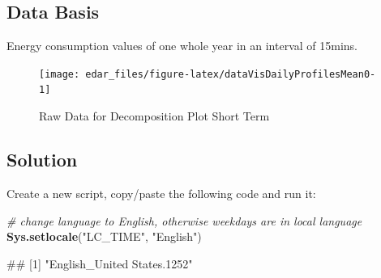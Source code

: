 \documentclass[
  a4paperpaper,
]{book}
\newenvironment{Shaded}{\begin{snugshade}}{\end{snugshade}}
\newcommand{\CommentTok}[1]{\textcolor[rgb]{0.56,0.35,0.01}{\textit{#1}}}
\newcommand{\KeywordTok}[1]{\textcolor[rgb]{0.13,0.29,0.53}{\textbf{#1}}}
\newcommand{\NormalTok}[1]{#1}
\newcommand{\StringTok}[1]{\textcolor[rgb]{0.31,0.60,0.02}{#1}}
\let\oldShaded\Shaded
\let\endoldShaded\endShaded
\renewenvironment{Shaded}{\footnotesize\oldShaded}{\endoldShaded}
\let\oldverbatim\verbatim
\let\endoldverbatim\endverbatim
\renewenvironment{verbatim}{\footnotesize\oldverbatim}{\endoldverbatim}
\begin{document}
\hypertarget{data-basis-10}{%
\subsection{Data Basis}\label{data-basis-10}}

Energy consumption values of one whole year in an interval of 15mins.

\begin{figure}
\texttt{[image: edar\_files/figure-latex/dataVisDailyProfilesMean0-1]} \caption{Raw Data for Decomposition Plot Short Term}\label{fig:dataVisDailyProfilesMean0}
\end{figure}

\newpage

\hypertarget{solution-10}{%
\subsection{Solution}\label{solution-10}}

Create a new script, copy/paste the following code and run it:

\begin{Shaded}
\begin{Highlighting}[]
\CommentTok{# change language to English, otherwise weekdays are in local language}
\KeywordTok{Sys.setlocale}\NormalTok{(}\StringTok{"LC_TIME"}\NormalTok{, }\StringTok{"English"}\NormalTok{)}
\end{Highlighting}
\end{Shaded}

\begin{verbatim}
## [1] "English_United States.1252"
\end{verbatim}
\end{document}
